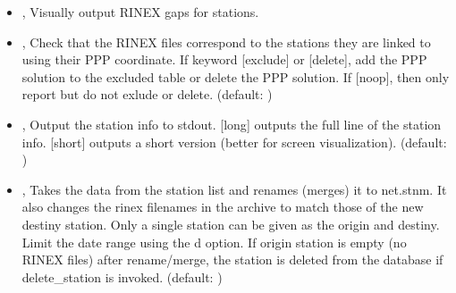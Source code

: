 \documentclass[letterpaper,10pt,english]{sphinxmanual}
\begin{document}
\begin{itemize}
\item {} 
\sphinxAtStartPar
{\hyperref[\detokenize{com:IntegrityCheck.py--gg}]{}}, {\hyperref[\detokenize{com:IntegrityCheck.py---graphical_gaps}]{}} \sphinxhyphen{} Visually output RINEX gaps for stations.

\item {} 
\sphinxAtStartPar
{\hyperref[\detokenize{com:IntegrityCheck.py--sc}]{}} , {\hyperref[\detokenize{com:IntegrityCheck.py---spatial_coherence}]{}}  \sphinxhyphen{} Check that the RINEX files correspond to the stations they are linked to using their PPP coordinate. If keyword {[}exclude{]} or {[}delete{]}, add the PPP solution to the excluded table or delete the PPP solution. If {[}noop{]}, then only report but do not exlude or delete. (default: )

\item {} 
\sphinxAtStartPar
{\hyperref[\detokenize{com:IntegrityCheck.py--print}]{}} , {\hyperref[\detokenize{com:IntegrityCheck.py---print_stninfo}]{}}  \sphinxhyphen{} Output the station info to stdout. {[}long{]} outputs the full line of the station info. {[}short{]} outputs a short version (better for screen visualization). (default: )

\item {} 
\sphinxAtStartPar
{\hyperref[\detokenize{com:IntegrityCheck.py--r}]{}} , {\hyperref[\detokenize{com:IntegrityCheck.py---rename}]{}}  \sphinxhyphen{} Takes the data from the station list and renames (merges) it to net.stnm. It also changes the rinex filenames in the archive to match those of the new destiny station. Only a single station can be given as the origin and destiny. Limit the date range using the \sphinxhyphen{}d option. If origin station is empty (no RINEX files) after rename/merge, the station is deleted from the database if \textendash{}delete\_station is invoked. (default: )


\end{itemize}
\end{document}
